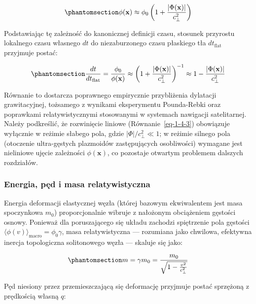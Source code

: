 \documentclass[
  polish,
  letterpaper,
  DIV=11,
  numbers=noendperiod,
  oneside]{scrartcl}
\begin{document}
\begin{equation}\protect\phantomsection\label{eq-1-4-3}{\phi(\mathbf{x}) \approx \phi_0 \left(1 + \frac{|\Phi(\mathbf{x})|}{c_{\perp}^2}\right)}\end{equation}

Podstawiając tę zależność do kanonicznej definicji czasu, stosunek
przyrostu lokalnego czasu własnego \(dt\) do niezaburzonego czasu
płaskiego tła \(dt_\text{flat}\) przyjmuje postać:

\begin{equation}\protect\phantomsection\label{eq-1-4-4}{\frac{dt}{dt_{\text{flat}}} = \frac{\phi_0}{\phi(\mathbf{x})} \approx \left(1 + \frac{|\Phi(\mathbf{x})|}{c_{\perp}^2}\right)^{-1} \approx 1 - \frac{|\Phi(\mathbf{x})|}{c_{\perp}^2}}\end{equation}

Równanie to dostarcza poprawnego empirycznie przybliżenia dylatacji
grawitacyjnej, tożsamego z wynikami eksperymentu Pounda-Rebki oraz
poprawkami relatywistycznymi stosowanymi w systemach nawigacji
satelitarnej. Należy podkreślić, że rozwinięcie liniowe
(Równanie~\ref{eq-1-4-3}) obowiązuje wyłącznie w reżimie słabego pola,
gdzie \(|\Phi|/c_\perp^2\ll 1\); w reżimie silnego pola (otoczenie
ultra-gęstych plazmoidów zastępujących osobliwości) wymagane jest
nieliniowe ujęcie zależności \(\phi(\mathbf{x})\), co pozostaje otwartym
problemem dalszych rozdziałów.

\subsubsection{Energia, pęd i masa relatywistyczna}\label{sec-1-4-4}

Energia deformacji elastycznej węzła (której bazowym ekwiwalentem jest
masa spoczynkowa \(m_0\)) proporcjonalnie wibruje z nałożonym
obciążeniem gęstości osnowy. Ponieważ dla poruszającego się układu
zachodzi spiętrzenie pola gęstości
\(\langle\phi(v)\rangle_{\text{macro}} = \phi_0\gamma\), masa
relatywistyczna --- rozumiana jako chwilowa, efektywna inercja
topologiczna solitonowego węzła --- skaluje się jako:

\begin{equation}\protect\phantomsection\label{eq-1-4-7}{m = \gamma m_0 = \frac{m_0}{\sqrt{1 - \frac{v^2}{c_{\perp}^2}}}}\end{equation}

Pęd niesiony przez przemieszczającą się deformację przyjmuje postać
sprzężoną z prędkością własną \(q\):
\end{document}
